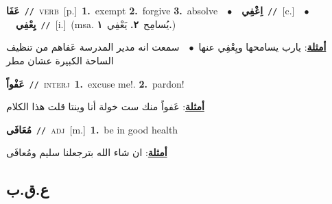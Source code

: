 \documentclass[10pt,a4paper,twoside]{article} %
\begin{document}
\begin{multicols}{2}
{\setlength\topsep{0pt}\textbf{\foreignlanguage{arabic}{عَفَا}}\ {\color{gray}\texttt{//}\color{black}}\ \textsc{verb}\ [p.]\ \textbf{1.}~exempt  \textbf{2.}~forgive  \textbf{3.}~absolve\ \ $\bullet$\ \ \setlength\topsep{0pt}\textbf{\foreignlanguage{arabic}{اِعْفِي}}\ {\color{gray}\texttt{//}\color{black}}\ [c.]\ \ $\bullet$\ \ \setlength\topsep{0pt}\textbf{\foreignlanguage{arabic}{يِعْفِي}}\ {\color{gray}\texttt{//}\color{black}}\ [i.]\ \color{gray}(msa. \foreignlanguage{arabic}{يُسامِح}~\foreignlanguage{arabic}{\textbf{٢.}}  \foreignlanguage{arabic}{يَعْفِي}~\foreignlanguage{arabic}{\textbf{١.}})\color{black}\  \begin{flushright}\color{gray}\foreignlanguage{arabic}{\textbf{\underline{\foreignlanguage{arabic}{أمثلة}}}: يارب يسامحها ويِعْفِي عنها\ $\bullet$\ \  سمعت انه مدير المدرسة عَفاهم من تنظيف الساحة الكبيرة عشان مطر}\end{flushright}\color{black}} \vspace{2mm}

{\setlength\topsep{0pt}\textbf{\foreignlanguage{arabic}{عَفْواً}}\ {\color{gray}\texttt{//}\color{black}}\ \textsc{interj}\ \textbf{1.}~excuse me!.  \textbf{2.}~pardon!\  \begin{flushright}\color{gray}\foreignlanguage{arabic}{\textbf{\underline{\foreignlanguage{arabic}{أمثلة}}}: عَفواً منك ست خولة أنا وينتا قلت هذا الكلام}\end{flushright}\color{black}} \vspace{2mm}

{\setlength\topsep{0pt}\textbf{\foreignlanguage{arabic}{مُعَافَى}}\ {\color{gray}\texttt{//}\color{black}}\ \textsc{adj}\ [m.]\ \textbf{1.}~be in good health\  \begin{flushright}\color{gray}\foreignlanguage{arabic}{\textbf{\underline{\foreignlanguage{arabic}{أمثلة}}}: ان شاء الله بترجعلنا سليم ومُعافَى}\end{flushright}\color{black}} \vspace{2mm}

\vspace{-3mm}
\subsection*{\color{blue}\foreignlanguage{arabic}{ع.ق.ب}\color{blue}{}} 


\end{multicols}
\end{document}
